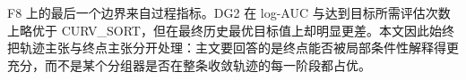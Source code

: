 F8 上的最后一个边界来自过程指标。DG2 在 log-AUC 与达到目标所需评估次数上略优于 CURV\_SORT，但在最终历史最优目标值上却明显更差。本文因此始终把轨迹主张与终点主张分开处理：主文要回答的是终点能否被局部条件性解释得更充分，而不是某个分组器是否在整条收敛轨迹的每一阶段都占优。